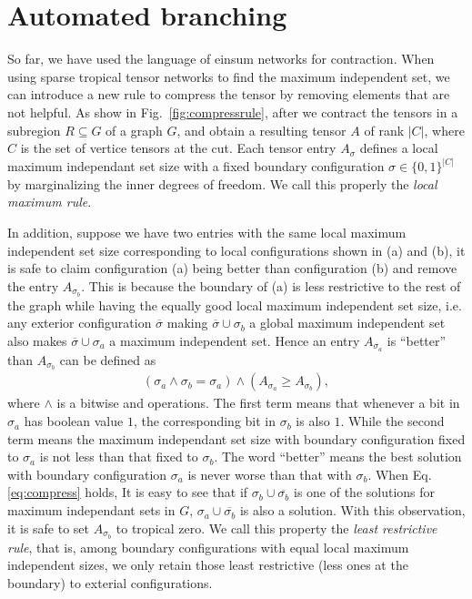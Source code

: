 \documentclass{article}
\newcommand{\<}{\langle}
\renewcommand{\>}{\rangle}
\newcommand{\Fig}[1]{Fig.~\ref{#1}}
\theoremstyle{definition}\newtheorem{definition}{\textit{Definition}}
\begin{document}
\section{Automated branching}
So far, we have used the language of einsum networks for contraction.
When using sparse tropical tensor networks to find the maximum independent set, we can introduce a new rule to compress the tensor by removing elements that are not helpful.
As show in \Fig{fig:compressrule}, after we contract the tensors in a subregion $R \subseteq G$ of a graph $G$, and obtain a resulting tensor $A$ of rank $|C|$, where $C$ is the set of vertice tensors at the cut.
Each tensor entry $A_{\sigma}$ defines a local maximum independant set size with a fixed boundary configuration $\sigma \in \{0,1\}^{|C|}$ by marginalizing the inner degrees of freedom.
We call this properly the \textit{local maximum rule}.

In addition, suppose we have two entries with the same local maximum independent set size corresponding to local configurations shown in (a) and (b), it is safe to claim configuration (a) being better than configuration (b) and remove the entry $A_{\sigma_b}$.
This is because the boundary of (a) is less restrictive to the rest of the graph while having the equally good local maximum independent set size, 
i.e. any exterior configuration $\overline{\sigma}$ making $\overline{\sigma} \cup \sigma_b$ a global maximum independent set also makes $\overline{\sigma} \cup \sigma_a$ a maximum independent set.
Hence an entry $A_{\sigma_a}$ is ``better'' than $A_{\sigma_b}$ can be defined as
\begin{align}
(\sigma_a \land \sigma_b = \sigma_a) \land (A_{\sigma_a} \geq A_{\sigma_b}),\label{eq:compress}
\end{align}
where $\land$ is a bitwise and operations.
The first term means that whenever a bit in $\sigma_a$ has boolean value $1$, the corresponding bit in $\sigma_b$ is also $1$.
While the second term means the maximum independant set size with boundary configuration fixed to $\sigma_a$ is not less than that fixed to $\sigma_b$.
The word ``better'' means the best solution with boundary configuration $\sigma_a$ is never worse than that with $\sigma_b$.
When Eq. \ref{eq:compress} holds, It is easy to see that if $\sigma_b \cup \overline{\sigma_b}$ is one of the solutions for maximum independant sets in $G$, $\sigma_a \cup \overline{\sigma_b}$ is also a solution.
With this observation, it is safe to set $A_{\sigma_b}$ to tropical zero.
We call this property the \textit{least restrictive rule}, that is,
among boundary configurations with equal local maximum independent sizes,
we only retain those least restrictive (less ones at the boundary) to exterial configurations.
\end{document}
